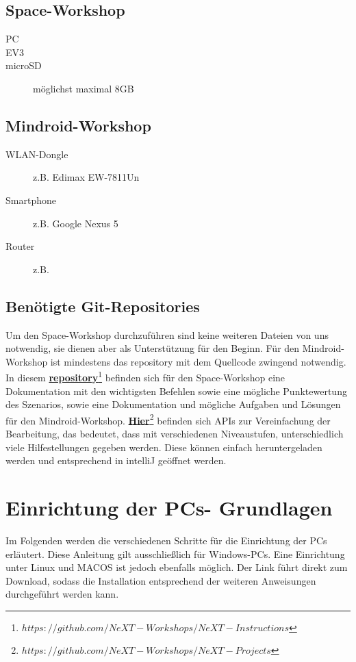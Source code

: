 \documentclass[
	ngerman,
	accentcolor=1c,%
	]{tudapub}
\begin{document}
\subsection{Space-Workshop}
\label{Space-Workshop}
\begin{description}
	\item[PC]
	\item[EV3]
	\item[microSD] m\"oglichst maximal 8GB
\end{description}

\subsection{Mindroid-Workshop}
\label{Mindroid-Workshop}


\begin{description}
	\item[WLAN-Dongle] z.B. Edimax EW-7811Un
	\item[Smartphone] z.B. Google Nexus 5
	\item[Router] z.B. 
\end{description}

\subsection{Ben\"otigte Git-Repositories}
\label{git-repos}
Um den Space-Workshop durchzuf\"uhren sind keine weiteren Dateien von uns notwendig, sie dienen aber als Unterst\"utzung f\"ur den Beginn. F\"ur den Mindroid-Workshop ist mindestens das repository mit dem Quellcode zwingend notwendig.\newline
In diesem
\href{https://github.com/NeXT-Workshops/NeXT-Instructions}{\textbf{repository}\footnote{$https://github.com/NeXT-Workshops/NeXT-Instructions$}}
befinden sich für den Space-Workshop eine Dokumentation mit den wichtigsten Befehlen sowie eine m\"ogliche Punktewertung des Szenarios, sowie eine Dokumentation und m\"ogliche Aufgaben und L\"osungen f\"ur den Mindroid-Workshop.
\href{https://github.com/NeXT-Workshops/NeXT-Projects}{\textbf{Hier}\footnote{$https://github.com/NeXT-Workshops/NeXT-Projects$}}
befinden sich APIs zur Vereinfachung der Bearbeitung, das bedeutet, dass mit verschiedenen Niveaustufen, unterschiedlich viele Hilfestellungen gegeben werden. Diese k\"onnen einfach heruntergeladen werden und entsprechend in intelliJ ge\"offnet werden.


\section{Einrichtung der PCs- Grundlagen}
\label{EinrichtungPC}
Im Folgenden werden die verschiedenen Schritte für die Einrichtung der PCs erl\"autert. Diese Anleitung gilt ausschlie\ss{}lich f\"ur Windows-PCs. Eine Einrichtung unter Linux und MACOS ist jedoch ebenfalls m\"oglich.\newline
Der Link f\"uhrt direkt zum Download, sodass die Installation entsprechend der weiteren Anweisungen durchgef\"uhrt werden kann.\newline
\end{document}
